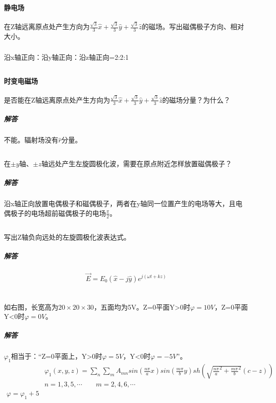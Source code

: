 \documentclass[UTF8]{ctexart}
\begin{document}
\section{}
\subsection{}
\paragraph{静电场}
在Z轴远离原点处产生方向为$\frac{\sqrt 3}{3}\hat x+\frac{\sqrt 3}{3}\hat y+\frac{\sqrt 3}{3}\hat z$的磁场。写出磁偶极子方向、相对大小。
\subparagraph{}
沿x轴正向：沿y轴正向：沿z轴正向=2:2:1
\subsection{}
\paragraph{时变电磁场}
是否能在Z轴远离原点处产生方向为$\frac{\sqrt 3}{3}\hat x+\frac{\sqrt 3}{3}\hat y+\frac{\sqrt 3}{3}\hat z$的磁场分量？为什么？
\subparagraph{解答}
不能。辐射场没有$\hat r$分量。
\subsection{}
\paragraph{}
在$\pm y$轴、$\pm z$轴远处产生左旋圆极化波，需要在原点附近怎样放置磁偶极子？
\subparagraph{解答}
沿x轴正向放置电偶极子和磁偶极子，两者在y轴同一位置产生的电场等大，且电偶极子的电场超前磁偶极子的电场$\frac{\pi}{2}$。
\subsection{}
\paragraph{}
写出Z轴负向远处的左旋圆极化波表达式。
\subparagraph{解答}
\[\vec E=E_0(\hat x-j\hat y)e^{j(\omega t+kz)}\]
\section{}
\paragraph{}
如右图，长宽高为$20\times 20\times 30$，五面均为5V。Z=0平面Y>0时$\varphi=10V$，Z=0平面Y<0时$\varphi=0V$。
\subparagraph{解答}
$\varphi_1$相当于：“Z=0平面上，Y>0时$\varphi=5V$，Y<0时$\varphi=-5V$”。
\begin{equation*}
\begin{aligned}
&\varphi_1(x,y,z)=\sum_{n}^{}\sum_{m}^{}A_{mn}sin(\frac{n\pi}{a}x)sin(\frac{m\pi}{b}y)sh(\sqrt{{\frac{n\pi}{a}}^2+{\frac{m\pi}{b}}^2}(c-z))\\
&n=1,3,5,\cdots \quad\quad m=2,4,6,\cdots\\
\varphi=\varphi_1+5
\end{aligned}
\end{equation*}
\end{document}
